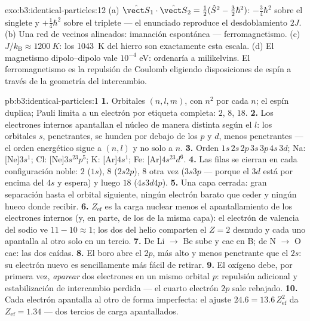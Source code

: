 \begin{solution}{exo:b3:identical-particles:12}
(a) $\hat{\vect S}_1\cdot\hat{\vect S}_2 = \tfrac12(\hat S^2 -
\tfrac32\hbar^2)$: $-\tfrac34\hbar^2$ sobre el singlete y
$+\tfrac14\hbar^2$ sobre el triplete --- el  enunciado
reproduce el desdoblamiento $2J$. (b) Una red de vecinos alineados:
imanación espontánea --- ferromagnetismo. (c) $J/k_{\text{B}}
\approx \qty{1200}{K}$: los \qty{1043}{K} del hierro son exactamente esta
escala. (d) El magnetismo dipolo--dipolo vale $10^{-4}$ eV: ordenaría a
milikelvins. El ferromagnetismo es la repulsión de Coulomb eligiendo
disposiciones de espín a través de la geometría del intercambio.
\end{solution}

\begin{solution}{pb:b3:identical-particles:1}
\textbf{1.} Orbitales $(n, l, m)$, con $n^2$ por cada $n$; el espín duplica;
Pauli limita a un electrón por etiqueta completa: $2$, $8$, $18$.
\textbf{2.} Los electrones internos apantallan el núcleo de manera distinta
según el $l$: los orbitales $s$, penetrantes, se hunden por debajo de los
$p$ y $d$, menos penetrantes --- el orden energético sigue a $(n, l)$ y no
solo a $n$.
\textbf{3.} Orden $1s\,2s\,2p\,3s\,3p\,4s\,3d$; Na: [Ne]$3s^1$;
Cl: [Ne]$3s^23p^5$; K: [Ar]$4s^1$; Fe: [Ar]$4s^23d^6$.
\textbf{4.} Las filas se cierran en cada configuración noble: $2$ ($1s$),
$8$ ($2s2p$), $8$ otra vez ($3s3p$ --- porque el $3d$ está por encima del
$4s$ y espera) y luego $18$ ($4s3d4p$).
\textbf{5.} Una capa cerrada: gran separación hasta el orbital siguiente,
ningún electrón barato que ceder y ningún hueco donde recibir.
\textbf{6.} $Z_{\text{ef}}$ es la carga nuclear menos el
apantallamiento de los electrones internos (y, en parte, de los de la misma
capa): el electrón de valencia del sodio ve $11 - 10 \approx 1$; los dos del
helio comparten el $Z = 2$ desnudo y cada uno apantalla al otro solo en un
tercio.
\textbf{7.} De Li $\to$ Be sube y cae en B; de N $\to$ O cae:
las dos caídas.
\textbf{8.} El boro abre el $2p$, más alto y menos penetrante que
el $2s$: su electrón nuevo es sencillamente más fácil de retirar.
\textbf{9.} El oxígeno debe, por primera vez, \emph{aparear} dos
electrones en un mismo orbital $p$: repulsión adicional y estabilización de
intercambio perdida --- el cuarto electrón $2p$ sale rebajado.
\textbf{10.} Cada electrón apantalla al otro de forma imperfecta:
el ajuste $24.6 = 13.6\,Z_{\text{ef}}^2$ da $Z_{\text{ef}} =
1.34$ --- dos tercios de carga apantallados.

\end{solution}
